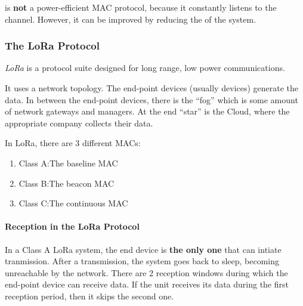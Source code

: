 \begin{remark*}
   is \textbf{not} a power-efficient MAC protocol, because it constantly listens to the channel.
  However, it can be improved by reducing the  of the system.
\end{remark*}

\subsubsection{The LoRa Protocol}\label{subsubsec:LoRa_Protocol}
\begin{definition}[LoRa]\label{def:LoRa}
  \emph{LoRa} is a protocol suite designed for long range, low power communications.

  It uses a  network topology.
  The end-point devices (usually  devices) generate the data.
  In between the end-point devices, there is the ``fog'' which is some amount of network gateways and managers.
  At the end ``star'' is the Cloud, where the appropriate company collects their data.
\end{definition}

In LoRa, there are 3 different MACs:
\begin{enumerate}[noitemsep]
\item Class A:\@ The baseline MAC
\item Class B:\@ The beacon MAC
\item Class C:\@ The continuous MAC
\end{enumerate}

\paragraph{Reception in the LoRa Protocol}\label{par:LoRa_Reception}
In a Class A LoRa system, the end device is \textbf{the only one} that can intiate tranmission.
After a transmission, the system goes back to sleep, becoming unreachable by the network.
There are 2 reception windows during which the end-point device can receive data.
If the unit receives its data during the first reception period, then it skips the second one.

